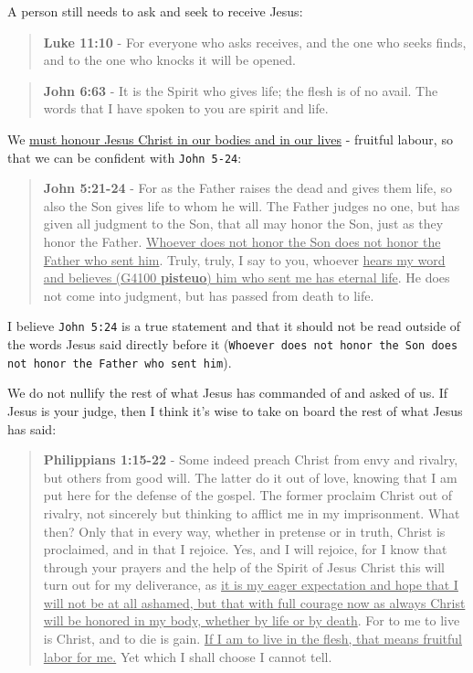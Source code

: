 \documentclass[11pt]{article}
\begin{document}
A person still needs to ask and seek to receive Jesus:

\begin{quote}
\textbf{Luke 11:10} - For everyone who asks receives, and the one who seeks finds, and to the one who knocks it will be opened.
\end{quote}

\begin{quote}
\textbf{John 6:63} - It is the Spirit who gives life; the flesh is of no avail. The words that I have spoken to you are spirit and life.
\end{quote}

We \uline{must honour Jesus Christ in our bodies and in our lives} - fruitful labour, so that we can be confident with \texttt{John 5-24}:

\begin{quote}
\textbf{John 5:21-24} - For as the Father raises the dead and gives them life, so also the Son gives life to whom he will. The Father judges no one, but has given all judgment to the Son, that all may honor the Son, just as they honor the Father. \uline{Whoever does not honor the Son does not honor the Father who sent him}. Truly, truly, I say to you, whoever \uline{hears my word and believes (G4100 \textbf{pisteuo}) him who sent me has eternal life}. He does not come into judgment, but has passed from death to life.
\end{quote}

I believe \texttt{John 5:24} is a true statement and that it should not be read outside of the words Jesus said directly before it (\texttt{Whoever does not honor the Son does not honor the Father who sent him}).

We do not nullify the rest of what Jesus has commanded of and asked of us. If Jesus is your judge, then I think it's wise to take on board the rest of what Jesus has said:

\begin{quote}
\textbf{Philippians 1:15-22} - Some indeed preach Christ from envy and rivalry, but others from good will. The latter do it out of love, knowing that I am put here for the defense of the gospel. The former proclaim Christ out of rivalry, not sincerely but thinking to afflict me in my imprisonment. What then? Only that in every way, whether in pretense or in truth, Christ is proclaimed, and in that I rejoice. Yes, and I will rejoice, for I know that through your prayers and the help of the Spirit of Jesus Christ this will turn out for my deliverance, as \uline{it is my eager expectation and hope that I will not be at all ashamed, but that with full courage now as always Christ will be honored in my body, whether by life or by death}. For to me to live is Christ, and to die is gain. \uline{If I am to live in the flesh, that means fruitful labor for me.} Yet which I shall choose I cannot tell.
\end{quote}
\end{document}
